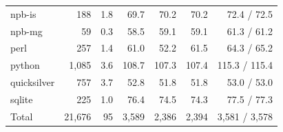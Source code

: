 \begin{tabular}{lrrrrrr}
npb-is & 188 & 1.8 & 69.7 & 70.2 & 70.2 & 72.4 / 72.5 \\
npb-mg & 59 & 0.3 & 58.5 & 59.1 & 59.1 & 61.3 / 61.2 \\
perl & 257 & 1.4 & 61.0 & 52.2 & 61.5 & 64.3 / 65.2 \\
python & 1{,}085 & 3.6 & 108.7 & 107.3 & 107.4 & 115.3 / 115.4 \\
quicksilver & 757 & 3.7 & 52.8 & 51.8 & 51.8 & 53.0 / 53.0 \\
sqlite & 225 & 1.0 & 76.4 & 74.5 & 74.3 & 77.5 / 77.3 \\
\midrule
Total & 21{,}676 & 95 & 3{,}589 & 2{,}386 & 2{,}394 & 3{,}581 / 3{,}578 \\
\bottomrule
\end{tabular}
